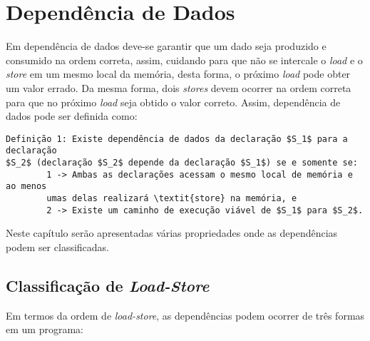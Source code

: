 \section{Dependência de Dados}

Em dependência de dados deve-se garantir que um dado seja produzido e consumido
na ordem correta, assim, cuidando para que não se intercale o \textit{load} e o
\textit{store} em um mesmo local da memória, desta forma, o próximo
\textit{load} pode obter um valor errado. 
Da mesma forma, dois \textit{stores} devem ocorrer na ordem correta para 
que no próximo \textit{load} seja obtido o valor correto.
Assim, dependência de dados pode ser definida como:

\begin{verbatim}
Definição 1: Existe dependência de dados da declaração $S_1$ para a declaração 
$S_2$ (declaração $S_2$ depende da declaração $S_1$) se e somente se:
        1 -> Ambas as declarações acessam o mesmo local de memória e ao menos
        umas delas realizará \textit{store} na memória, e
        2 -> Existe um caminho de execução viável de $S_1$ para $S_2$.
\end{verbatim}

Neste capítulo serão apresentadas várias propriedades onde as dependências 
podem ser classificadas.


\subsection{Classificação de \textit{Load-Store}}

Em termos da ordem de \textit{load-store}, as dependências podem ocorrer de 
três formas em um programa:

